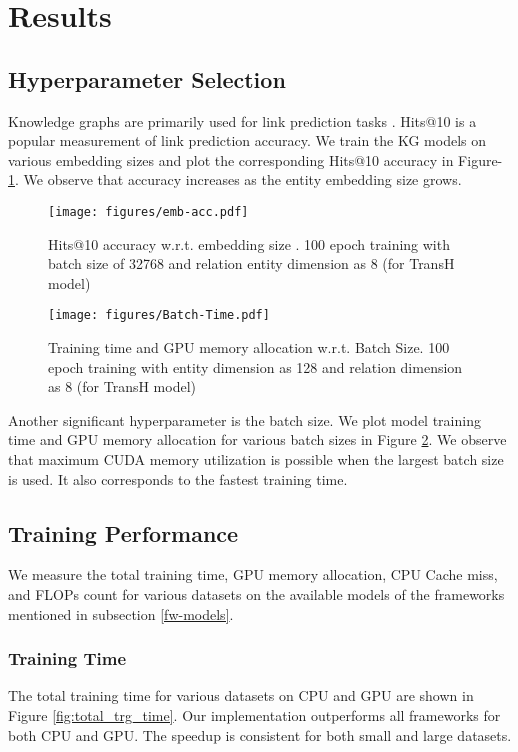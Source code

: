 \section{Results}
    \subsection{Hyperparameter Selection}
    \label{hyperparam_selection}
    Knowledge graphs are primarily used for link prediction tasks \cite{gregucci2023link}. Hits@10 is a popular measurement of link prediction accuracy. We train the KG models on various embedding sizes and plot the corresponding Hits@10 accuracy in Figure-\ref{fig:acc-emb}. We observe that accuracy increases as the entity embedding size grows. 

    \begin{figure}[h]
    \centering
    \texttt{[image: figures/emb-acc.pdf]}
    \caption{Hits@10 accuracy w.r.t. embedding size . 100 epoch training with batch size of 32768 and relation entity dimension as 8 (for TransH model)}
    \label{fig:acc-emb}
    \end{figure}
     \begin{figure}[ht]
    \centering
    \texttt{[image: figures/Batch-Time.pdf]}
    \caption{Training time and GPU memory allocation w.r.t. Batch Size. 100 epoch training with entity dimension as 128 and relation dimension as 8 (for TransH model)}
    \label{fig:batch-corr}
    \end{figure}

    Another significant hyperparameter is the batch size. We plot model training time and GPU memory allocation for various batch sizes in Figure \ref{fig:batch-corr}. We observe that maximum CUDA memory utilization is possible when the largest batch size is used. It also corresponds to the fastest training time.


    \subsection{Training Performance}
    We measure the total training time, GPU memory allocation, CPU Cache miss, and FLOPs count for various datasets on the available models of the frameworks mentioned in subsection \ref{fw-models}.

    \subsubsection{Training Time}
    The total training time for various datasets on CPU and GPU are shown in Figure \ref{fig:total_trg_time}. Our implementation outperforms all frameworks for both CPU and GPU. The speedup is consistent for both small and large datasets. 
    

